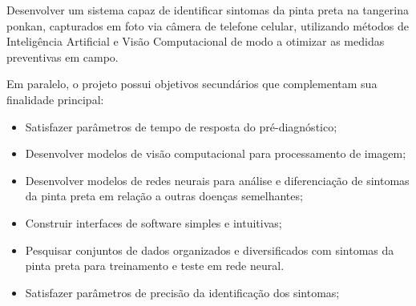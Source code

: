 Desenvolver um sistema capaz de identificar sintomas da pinta preta na tangerina ponkan, capturados em foto via câmera de telefone celular, utilizando métodos de Inteligência Artificial e Visão Computacional de modo a otimizar as medidas preventivas em campo. 

Em paralelo, o projeto possui objetivos secundários que complementam sua finalidade principal:\\


\begin{itemize}
    \item Satisfazer parâmetros de tempo de resposta do pré-diagnóstico;
    \item Desenvolver modelos de visão computacional para processamento de imagem;
    \item Desenvolver modelos de redes neurais para análise e diferenciação de sintomas da pinta preta em relação a outras doenças semelhantes;
    \item Construir interfaces de software simples e intuitivas;
    \item Pesquisar conjuntos de dados organizados e diversificados com sintomas da pinta preta para treinamento e teste em rede neural.
    \item Satisfazer parâmetros de precisão da identificação dos sintomas;
\end{itemize}
